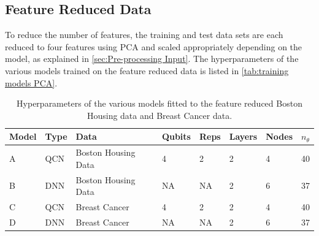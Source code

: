 \subsection{Feature Reduced Data}\label{sec:Feature Reduced Data}
To reduce the number of features, the training and test data sets are each reduced to four features using PCA and scaled appropriately depending on the model, as explained in \autoref{sec:Pre-processing Input}. The hyperparameters of the various models trained on the feature reduced data is listed in \autoref{tab:training models PCA}.

\begin{table}[H]
\centering
\caption{Hyperparameters of the various models fitted to the feature reduced Boston Housing data and Breast Cancer data.} 
\begin{tabular}{|l|l|l|l|l|l|l|l|}
\hline
Model& Type& Data& Qubits& Reps& Layers & Nodes &$n_{\theta}$ \\ \hline
A    & QCN & Boston Housing Data  & 4     & 2  &2     & 4& 40   \\ \hline
B    & DNN & Boston Housing Data  & NA    & NA &2     & 6& 37 \\ \Xhline{2\arrayrulewidth}
C    & QCN & Breast Cancer        & 4     & 2  &2     & 4& 40  \\ \hline
D    & DNN & Breast Cancer        & NA    & NA &2     & 6& 37  \\ \hline
\end{tabular}

\label{tab:training models PCA}
\end{table}


%        

